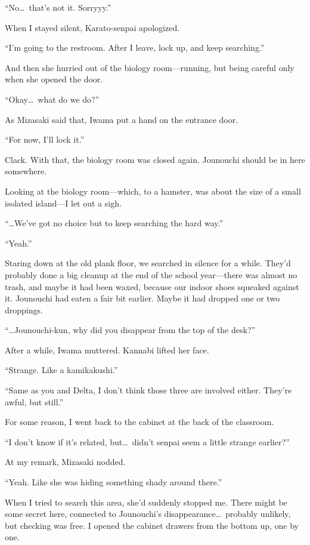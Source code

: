 \documentclass[
    a4paper,
    12pt,
    twoside,
    openany,
    UTF8,
    fontset=windows
]{ctexbook}
\begin{document}
``No\dots\ that's not it. Sorryyy.''

When I stayed silent, Karato-senpai apologized.

``I'm going to the restroom. After I leave, lock up, and keep searching.''

And then she hurried out of the biology room---running, but being careful only when she opened the door.

``Okay\dots\ what do we do?''

As Mizasaki said that, Iwama put a hand on the entrance door.

``For now, I'll lock it.''

Clack. With that, the biology room was closed again. Jounouchi should be in here somewhere.

Looking at the biology room---which, to a hamster, was about the size of a small isolated island---I let out a sigh.

``\dots We've got no choice but to keep searching the hard way.''

``Yeah.''

Staring down at the old plank floor, we searched in silence for a while. They'd probably done a big cleanup at the end of the school year---there was almost no trash, and maybe it had been waxed, because our indoor shoes squeaked against it. Jounouchi had eaten a fair bit earlier. Maybe it had dropped one or two droppings.

``\dots Jounouchi-kun, why did you disappear from the top of the desk?''

After a while, Iwama muttered. Kannabi lifted her face.

``Strange. Like a kamikakushi.''

``Same as you and Delta, I don't think those three are involved either. They're awful, but still.''

For some reason, I went back to the cabinet at the back of the classroom.

``I don't know if it's related, but\dots\ didn't senpai seem a little strange earlier?''

At my remark, Mizasaki nodded.

``Yeah. Like she was hiding something shady around there.''

When I tried to search this area, she'd suddenly stopped me. There might be some secret here, connected to Jounouchi's disappearance\dots\ probably unlikely, but checking was free. I opened the cabinet drawers from the bottom up, one by one.
\end{document}
